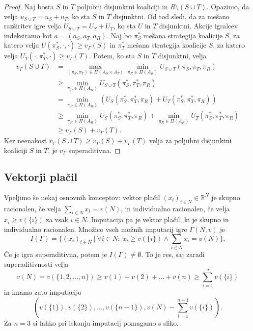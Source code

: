 \documentclass[10pt, a4paper]{article}
\newenvironment{noticeC}{%
  \tcolorbox[%
  notitle,
  empty,
  enhanced,  %
  breakable,
  coltext=black, 
  fontupper=\rmfamily,
  parbox=false,
  noparskip,
  sharp corners,
  boxrule=-1pt,  %
  frame hidden,
  left=7pt,  %
  right=7pt,
  top=5pt,
  bottom=5pt,
  before skip=2.5ex plus 2pt,
  after skip=2.5ex plus 2pt,
  overlay unbroken and last={%
  },
  ]}
{\endtcolorbox}
\newenvironment{dokaz}%
  {\begin{noticeC}\begin{proof}}%
  {\end{proof}\end{noticeC}}
\newcommand{\R}{\mathbb {R}}
\begin{document}
\begin{dokaz}
  Naj bosta $S$ in $T$ poljubni disjunktni koaliciji in $R \setminus (S \cup T)$.
  Opazimo, da velja $u_{S \cup T} = u_S + u_T$, ko sta $S$ in $T$ disjunktni.
  Od tod sledi, da za mešano razširitev igre velja $U_{S \cup T} = U_S + U_T$,
  ko sta $U$ in $T$ disjunktni.
  Akcije igralcev indeksiramo kot $a = (a_S, a_T, a_R)$.
  Naj bo $\pi_S ^*$ mešana strategija koalicije $S$, za katero velja $U(\pi_S^*, \cdot, \cdot) \geq v_\Gamma (S)$
  in $\pi_T^*$ mešana strategija koalicije $S$, za katero velja $U_T(\cdot, \pi_T^*, \cdot) \geq v_\Gamma (T)$.
  Potem, ko sta $S$ in $T$ disjunktni, velja 
  \begin{align*}
    v_\Gamma (S \cup T) &= \max_{(\pi_S, \pi_T) \in \Pi(A_S \times A_T)} \min_{\pi_R \in \Pi(A_R)} U_{S \cup T} (\pi_S, \pi_T, \pi_R)\\
    &\geq \min_{\pi_R \in \Pi(A_R)} U_{S \cup T} (\pi_S^*, \pi_T^*, \pi_R)\\
    &= \min_{\pi_R \in \Pi(A_R)} \left(U_S (\pi_S^*, \pi_T^*, \pi_R) + U_T (\pi_S^*, \pi_T^*, \pi_R)\right)\\
    &\geq \min_{\pi_R \in \Pi(A_R)} U_S (\pi_S^*, \pi_T^*, \pi_R) + \min_{\pi_R \in \Pi(A_R)} U_T (\pi_S^*, \pi_T^*, \pi_R)\\
    &\geq v_\Gamma(S) + v_\Gamma(T).
  \end{align*}
  Ker neenakost $v_\Gamma(S \cup T) \geq v_\Gamma (S) + v_\Gamma(T)$ velja za poljubni disjunktni koaliciji $S$ in $T$,
  je $v_\Gamma$ superaditivna.
\end{dokaz}

\subsection{Vektorji plačil}

Vpeljimo še nekaj osnovnih konceptov: vektor plačil $(x_i)_{i \in N} \in \R^N$
je skupno racionalen, če velja $\sum_{i \in N} x_i = v(N)$, in individualno racionalen,
če velja $x_i \geq v(\{i\})$ za vsak $i \in N$.
Imputacija pa je vektor plačil, ki je skupno in individualno racionalen.
Množico vseh možnih imputacij igre $\Gamma(N, v)$ je 
$$I(\Gamma) = \{(x_i)_{i \in N}\ |\ \forall i \in N:\ x_i \geq v(\{i\}) \wedge \sum_{i \in N} x_i = v(N)\}.$$
Če je igra superaditivna, potem je $I(\Gamma) \neq \emptyset$.
To je res, saj zaradi superaditivnosti velja 
$$v(N) = v(\{1, 2, \dots, n\}) \geq v(1) + v(2) + \dots + v(n) \geq \sum_{i = 1} ^n v(\{i\})$$
in imamo zato imputacijo
$$\left(v(\{1\}), v(\{2\}),\dots, v(\{n - 1\}), v(N) - \sum_{i = 1} ^{n - 1} v(\{i\}) \right).$$ 
Za $n = 3$ si lahko pri iskanju imputacij pomagamo s sliko.
\end{document}
